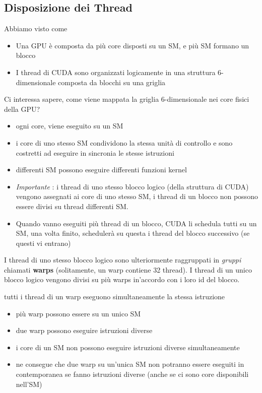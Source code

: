 \documentclass[10pt, letterpaper]{report}
\begin{document}
\subsection{Disposizione dei Thread}
Abbiamo visto come \begin{itemize}
   \item Una GPU è composta da più core disposti su un SM, e più SM formano un blocco 
   \item I thread di CUDA sono organizzati logicamente in una struttura 6-dimensionale composta da blocchi su una griglia
\end{itemize}
Ci interessa sapere, come viene mappata la griglia 6-dimensionale nei core fisici della GPU?\begin{itemize}
    \item ogni core, viene eseguito su un SM 
    \item i core di uno stesso SM condividono la stessa unità di controllo e sono costretti ad eseguire in sincronia le stesse istruzioni 
    \item differenti SM possono eseguire differenti funzioni kernel 
    \item \textit{Importante} : i thread di uno stesso blocco logico (della struttura di CUDA) vengono assegnati ai core di uno stesso SM, i thread di un blocco non possono essere divisi su thread differenti SM. 
    \item Quando vanno eseguiti più thread di un blocco, CUDA li schedula tutti su un SM, una volta finito, schedulerà su questa i thread del blocco successivo (se questi vi entrano)
\end{itemize}
I thread di uno stesso blocco logico sono ulteriormente raggruppati in \textit{gruppi} chiamati \textbf{warps} (solitamente, un warp contiene 32 thread). I thread di un unico blocco logico vengono divisi su più warps in'accordo con i loro id del blocco. \begin{center}
    tutti i thread di un warp eseguono simultaneamente la stessa istruzione
\end{center}\begin{itemize}
    \item più warp possono essere su un unico SM 
    \item due warp possono eseguire istruzioni diverse 
    \item i core di un SM non possono eseguire istruzioni diverse simultaneamente 
    \item ne consegue che due warp su un'unica SM non potranno essere eseguiti in contemporanea se fanno istruzioni diverse (anche se ci sono core disponibili nell'SM)
\end{itemize}
\end{document}

